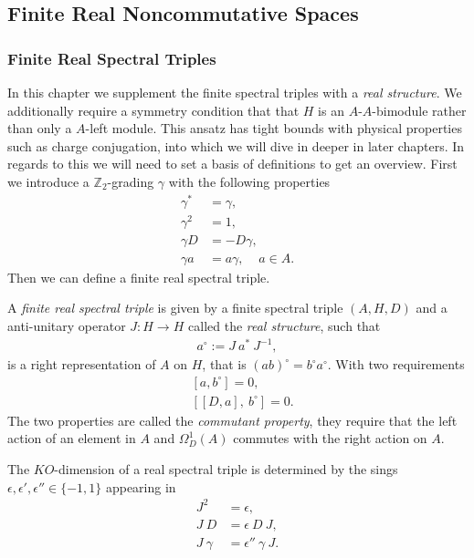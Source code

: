 \subsection{Finite Real Noncommutative Spaces}
\subsubsection{Finite Real Spectral Triples}
In this chapter we supplement the finite spectral triples with a \textit{real
structure}. We additionally require a symmetry condition that that $H$ is an
$A$-$A$-bimodule rather than only a $A$-left module. This ansatz has tight
bounds with physical properties such as charge conjugation, into which we will
dive in deeper in later chapters. In regards to this we will need to set a basis
of definitions to get an overview.
First we introduce a $\mathbb{Z}_2$-grading $\gamma$ with the following
properties
\begin{align}
    \gamma ^* &= \gamma, \\
    \gamma ^2 &= 1, \\
    \gamma D &= - D \gamma,\\
    \gamma a &= a \gamma, \;\;\;\; a\in A.
\end{align}
Then we can define a finite real spectral triple.
\begin{mydefinition}
    A \textit{finite real spectral triple} is given by a finite spectral
    triple $(A, H, D)$ and a anti-unitary operator $J:H\rightarrow H$ called
    the \textit{real structure}, such that
    \begin{align}
        a^\circ := J\ a^*\ J^{-1},
    \end{align}
    is a right representation of $A$ on $H$, that is $(ab)^\circ = b^\circ
    a^\circ$. With two requirements
    \begin{align}
        &[a, b^\circ] = 0,\\
        &[[D, a],\ b^\circ] = 0.
    \end{align}
    The two properties are called the \textit{commutant property}, they
    require that the left action of an element in $A$ and $\Omega _D^1(A)$ commutes with the right
    action on $A$.
\end{mydefinition}
\begin{mydefinition}
    The $KO$-dimension of a real spectral triple is determined by the sings
    $\epsilon, \epsilon ' ,\epsilon '' \in \{-1, 1\}$ appearing in
    \begin{align}
        J^2 &= \epsilon, \\
        J\ D &= \epsilon \ D\ J,\\
        J\ \gamma &= \epsilon''\ \gamma\ J.
    \end{align}
\end{mydefinition}
